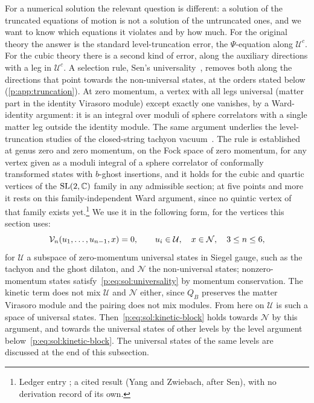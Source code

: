 For a numerical solution the relevant question is different: a solution of the truncated equations of motion is not a solution of the untruncated ones, and we want to know which equations it violates and by how much.
For the original theory the answer is the standard level-truncation error, the $\Psi$-equation along $\mathcal U^c$.
For the cubic theory there is a second kind of error, along the auxiliary directions with a leg in $\mathcal U^c$.
A selection rule, Sen's universality~\cite{Sen:1999:UniversalityTachyonPotential}, removes both along the directions that point towards the non-universal states, at the orders stated below (\cref{p:app:truncation}).
At zero momentum, a vertex with all legs universal (matter part in the identity Virasoro module) except exactly one vanishes, by a Ward-identity argument: it is an integral over moduli of sphere correlators with a single matter leg outside the identity module.
The same argument underlies the level-truncation studies of the closed-string tachyon vacuum~\cite{Yang:2005:ClosedStringTachyon}.
The rule is established at genus zero and zero momentum, on the Fock space of zero momentum, for any vertex given as a moduli integral of a sphere correlator of conformally transformed states with $b$-ghost insertions, and it holds for the cubic and quartic vertices of the $\mathrm{SL}(2, \mathbb{C})$ family in any admissible section; at five points and more it rests on this family-independent Ward argument, since no quintic vertex of that family exists yet.\footnote{Ledger entry ; a cited result (Yang and Zwiebach, after Sen), with no derivation record of its own.}
We use it in the following form, for the vertices this section uses:
\begin{equation}
  \label{p:eq:sol:universality}
  \mathcal{V}_{n}(u_1, \ldots, u_{n-1}, x)
    = 0,
  \qquad
  u_i \in \mathcal U,
  \quad
  x \in \mathcal N,
  \quad
  3 \le n \le 6,
\end{equation}
for $\mathcal U$ a subspace of zero-momentum universal states in Siegel gauge, such as the tachyon and the ghost dilaton, and $\mathcal N$ the non-universal states; nonzero-momentum states satisfy~\eqref{p:eq:sol:universality} by momentum conservation.
The kinetic term does not mix $\mathcal U$ and $\mathcal N$ either, since $Q_B$ preserves the matter Virasoro module and the pairing does not mix modules.
From here on $\mathcal U$ is such a space of universal states.
  Then~\eqref{p:eq:sol:kinetic-block} holds towards $\mathcal N$ by this argument, and towards the universal states of other levels by the level argument below~\eqref{p:eq:sol:kinetic-block}.
  The universal states of the same levels are discussed at the end of this subsection.

